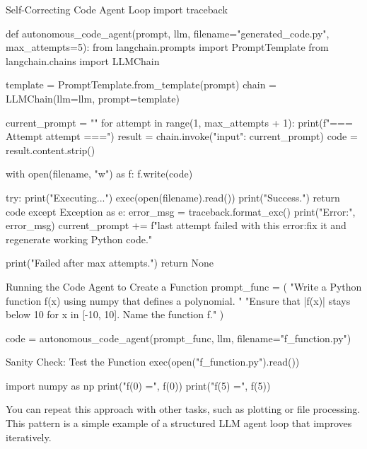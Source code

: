 \begin{codeonly}{Self-Correcting Code Agent Loop}
import traceback

def autonomous_code_agent(prompt, llm, filename="generated_code.py", max_attempts=5):
    from langchain.prompts import PromptTemplate
    from langchain.chains import LLMChain

    template = PromptTemplate.from_template(prompt)
    chain = LLMChain(llm=llm, prompt=template)
    
    current_prompt = ""
    for attempt in range(1, max_attempts + 1):
        print(f"\n=== Attempt {attempt} ===")
        result = chain.invoke({"input": current_prompt})
        code = result.content.strip()

        with open(filename, "w") as f:
            f.write(code)

        try:
            print("Executing...")
            exec(open(filename).read())
            print("Success.")
            return code
        except Exception as e:
            error_msg = traceback.format_exc()
            print("Error:\n", error_msg)
            current_prompt += f"\n\nThe last attempt failed with this error:\nPlease fix it and regenerate working Python code."
    
    print("Failed after max attempts.")
    return None
\end{codeonly}

\begin{codeonly}{Running the Code Agent to Create a Function}
prompt_func = (
    "Write a Python function f(x) using numpy that defines a polynomial. "
    "Ensure that |f(x)| stays below 10 for x in [-10, 10]. Name the function f."
)

code = autonomous_code_agent(prompt_func, llm, filename="f_function.py")
\end{codeonly}

\begin{codeonly}{Sanity Check: Test the Function}
exec(open("f_function.py").read())

import numpy as np
print("f(0) =", f(0))
print("f(5) =", f(5))
\end{codeonly}

You can repeat this approach with other tasks, such as plotting or file processing. This pattern is a simple example of a structured LLM agent loop that improves iteratively.


%
